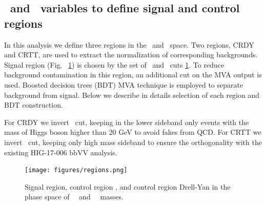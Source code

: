 \subsection{\HBB ~and \ZtoLL ~variables to define signal and control regions}

In this analysis we define three regions in the \HBB ~and \ZtoLL
~space. Two regions, CRDY and CRTT, are used to extract the
normalization of corresponding backgrounds. Signal region (Fig. ~\ref{fig:regions}) is chosen by
the set of \HBB~and \ZtoLL ~cuts \ref{fig:regions}. To reduce background contamination in this region, an additional cut on the MVA output is used. Boosted decision trees (BDT) MVA technique is employed to
separate background from signal. Below we describe in details
selection of each region and BDT construction. 

For CRDY we invert \HBB ~cut, keeping in the lower sideband only events
with the mass of Higgs boson higher than 20 GeV to avoid fakes from
QCD. For CRTT we invert \ZtoLL ~cut, keeping only high mass sideband to
ensure the orthogonality with the existing HIG-17-006 bbVV analysis.


\begin{figure}[!htb]%
  \begin{center}
    \texttt{[image: figures/regions.png]}
    \caption{ Signal region, control region \ttbar, and control region Drell-Yan in the phase space of \ZtoLL \ ~and ~\HBB ~masses.    }
    \label{fig:regions}
  \end{center}
\end{figure}


